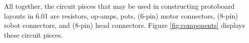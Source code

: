 All together, the circuit pieces that may be used in constructing protoboard
layouts in 6.01 are resistors, op-amps, pots, (6-pin) motor connectors, (8-pin)
robot connectors, and (8-pin) head connectors. Figure \ref{fig:components}
displays these circuit pieces.

\begin{figure}
\begin{center}
\hspace{3cm}
\\
\end{center}
\end{figure}
